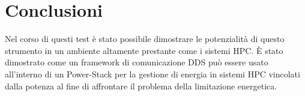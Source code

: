 \chapter{Conclusioni}
Nel corso di questi test è stato possibile dimostrare le potenzialità di questo strumento in un ambiente altamente prestante come i sistemi HPC. 
È stato dimostrato come un framework di comunicazione DDS può essere usato all'interno di un Power-Stack per la gestione di energia in sistemi HPC vincolati dalla potenza al fine di affrontare il problema della limitazione energetica. %